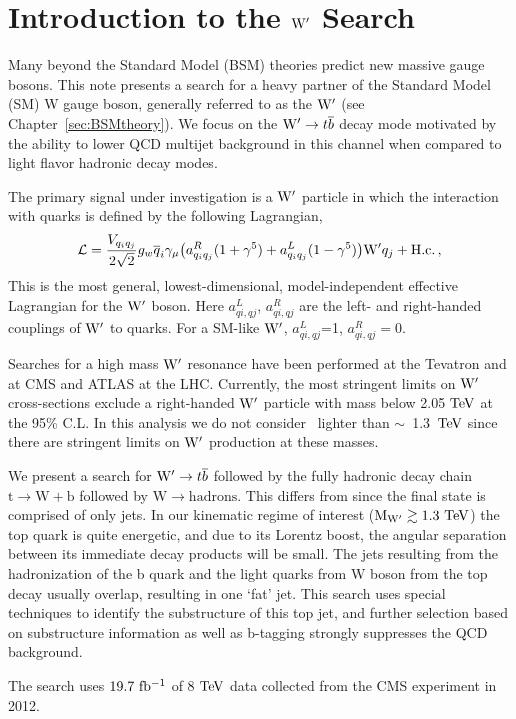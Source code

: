 
\chapter{Introduction to the $\mathrm{W}^\prime$ Search}

\label{sec:introduction}

Many beyond the Standard Model (BSM) theories predict new massive
gauge bosons.  This note presents a search for a heavy partner of
the Standard Model (SM) W gauge boson, generally referred to as the
$\mathrm{W}^\prime$ (see Chapter~\ref{sec:BSMtheory}).  
We focus on the $\mathrm{W}^\prime \to {t\overline{b}}$ decay mode motivated by the ability to lower QCD multijet background in this channel when compared to light flavor hadronic decay modes. 


The primary signal under investigation is a $\mathrm{W}^\prime$ particle in which the interaction with quarks 
is defined by the following Lagrangian,
\begin{eqnarray}
{\cal L} = \frac{V_{q_iq_j}}{2\sqrt{2}} g_w \overline{q}_i\gamma_\mu 
\bigl( a^R_{q_iq_j} (1+{\gamma}^5) + a^L_{q_iq_j}
(1-{\gamma}^5)\bigr) {\wpr} q_j + \mathrm{H.c.} \,,
\label{eqn:Lag}
\end{eqnarray}
This is the most general, lowest-dimensional, model-independent
effective Lagrangian for the $\mathrm{W}^\prime$ boson.  Here $a_{qi,qj}^{L}$,
$a_{qi,qj}^{R}$ are the left- and right-handed couplings of $\mathrm{W}^\prime$ to quarks.
For a SM-like $\mathrm{W}^\prime$, $a_{qi,qj}^{L}$=1, $a_{qi,qj}^{R}=0$.


Searches for a high mass $\mathrm{W}^\prime$ resonance have been performed at the
Tevatron \cite{PhysRevLett.100.211803,Abazov2011145} and at CMS \cite{CMS-PAS-B2G-12-010,CMS-PAS-EXO-12-060,CMS-PAS-EXO-12-025} and ATLAS \cite{PhysRevLett.109.081801} at the LHC.  
Currently, the most stringent limits on $\mathrm{W}^\prime$ cross-sections exclude a right-handed $\mathrm{W}^\prime$ particle with mass below 2.05$~\mathrm{TeV}$ at the 95\% C.L. In this analysis we do not consider \wpr\
  lighter than $\sim$~1.3~$\mathrm{TeV}$ since there are stringent limits on $\mathrm{W}^\prime$ production at these masses.  

We present a search for $\mathrm{W}^\prime \to {t\overline{b}}$ followed by the
fully hadronic decay chain $\mathrm{t \to W+b}$ followed by $\mathrm{W \to hadrons}$.
This differs from \cite{CMS-PAS-B2G-12-010} since the final state is
comprised of only jets.  In our kinematic regime of interest ($\mathrm{M_{\mathrm{W}^\prime}
\gtrsim 1.3~\mathrm{TeV}}$) the top quark is quite energetic, and due to its Lorentz
boost, the angular separation between its immediate decay products will
be small.  The jets resulting from the hadronization of the b quark
and the light quarks from W boson from the top decay usually overlap, resulting in one
`fat' jet.  This search uses special techniques to identify the
substructure of this top jet, and further selection based on
substructure information as well as b-tagging strongly suppresses the
QCD background.

The search uses $19.7~\mathrm{fb^{-1}}$ of 8$~\mathrm{TeV}$ data collected from
the CMS experiment in 2012.
